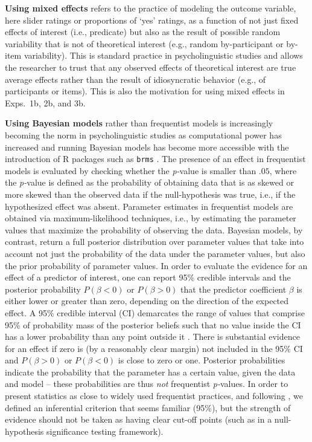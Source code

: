 \documentclass[11pt,fleqn]{article}
\newcommand{\6}{\mbox{$[\hspace*{-.6mm}[$}}
\newcommand{\9}{\mbox{$]\hspace*{-.6mm}]$}}
\begin{document}
\textbf{Using mixed effects} refers to the practice of modeling the outcome variable, here slider ratings or proportions of `yes' ratings, as a function of not just fixed effects of interest (i.e., predicate) but also as the result of possible random variability that is not of theoretical interest (e.g., random by-participant or by-item variability). This is standard practice in psycholinguistic studies and allows the researcher to trust that any observed effects of theoretical interest are true average effects rather than the result of idiosyncratic behavior (e.g., of participants or items). This is also the motivation for using mixed effects in Exps.~1b, 2b, and 3b.

\textbf{Using Bayesian models} rather than frequentist models is increasingly becoming the norm in psycholinguistic studies as computational power has increased and running Bayesian models has become more accessible with the introduction of R packages such as \verb|brms| \citep{buerkner2017}. The presence of an effect in frequentist models is evaluated by checking whether the {\em p-}value is smaller than $.05$, where the {\em p-}value is defined as the probability of obtaining data that is as skewed or more skewed than the observed data if the null-hypothesis was true, i.e., if the hypothesized effect was absent. Parameter estimates in frequentist models are obtained via maximum-likelihood techniques, i.e., by estimating the parameter values that maximize the probability of observing the data. Bayesian models, by contrast, return a full posterior distribution over parameter values that take into account not just the probability of the data under the parameter values, but also the prior probability of parameter values. In order to evaluate the evidence for an effect of a predictor of interest, one can report 95\% credible intervals and the posterior probability $P(\beta < 0)$ or $P(\beta > 0)$ that the predictor coefficient $\beta$ is either lower or greater than zero, depending on the direction of the expected effect. A 95\% credible interval (CI) demarcates the range of values that comprise 95\% of probability mass of the posterior beliefs such that no value inside the CI has a lower probability than any point outside it \citep{Jaynes1976, Morey2016}. There is substantial evidence for an effect if zero is (by a reasonably clear margin) not included in the 95\% CI and $P(\beta > 0)$ or $P(\beta < 0)$ is close to zero or one. Posterior probabilities indicate the probability that the parameter has a certain value, given the data and model -- these probabilities are thus \emph{not} frequentist {\em p-}values. In order to present statistics as close to widely used frequentist practices, and following \citealt{Nicenboim2016}, we defined an inferential criterion that seems familiar (95\%), but the strength of evidence should not be taken as having clear cut-off points (such as in a null-hypothesis significance testing framework).
\end{document}
